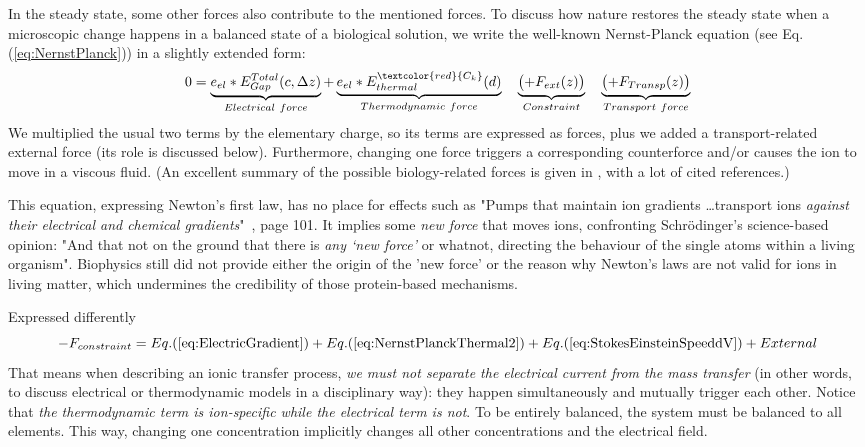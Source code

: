 In the steady state, some other forces also contribute to
the mentioned forces. To discuss how nature restores the steady state when a microscopic change happens in a
balanced state of a biological solution, we write the well-known Nernst-Planck
equation (see Eq.(\ref{eq:NernstPlanck})) in a slightly extended form:
%
\begin{equation}
	0 = \underbrace{ e_{el}*E_{Gap}^{Total}(c,\Delta z)}_{Electrical~force} +\underbrace{e_{el}*E_{thermal}^{\textcolor{red}{C_k}}(d)}_{Thermodynamic~force} \quad\underbrace{\bigl(+F_{ext}(z)\bigr)}_{Constraint}\quad\underbrace{\bigl(+F_{Transp}(z)\bigr)}_{Transport~force}\label{eq:NernstPlanckExtended}
\end{equation}
We multiplied the usual two terms by the elementary charge, so its terms are expressed as forces, plus we added a transport-related external force (its role is discussed below).
Furthermore, changing one force triggers a corresponding counterforce and/or causes the ion to move in a viscous fluid.
(An excellent summary of the possible biology-related forces is given in \cite{QuantitativeBiophysicalForces:2014}, with a lot of cited references.) 

This equation, expressing Newton's first law, has no place for effects such as "Pumps that maintain
ion gradients \dots transport ions \textit{against their
	electrical and chemical gradients}"~\cite{PrinciplesNeuralScience:2013}, page 101. It implies some \textit{new force} that moves ions,
confronting Schrödinger's science-based opinion:
"And that not on the ground that there is \textit{any ‘new force’} or whatnot, directing the behaviour of the single atoms within a living organism"\cite{Schrodinger:1992}. Biophysics still did not provide
either the origin of the 'new force' or the reason why Newton's laws are 
not valid for ions in living matter, which undermines the credibility of
those protein-based mechanisms.
\else

\fi


\ifx\magyar\undefined
Expressed differently
\begin{equation}
	-F_{constraint} = Eq.(\ref{eq:ElectricGradient}) + Eq.(\ref{eq:NernstPlanckThermal2}) + Eq.(\ref{eq:StokesEinsteinSpeeddV}) + External
	\label{eq:IonicForces}
\end{equation}
\noindent
That means when describing an ionic transfer process, \textit{we must not separate the electrical current from the mass transfer} (in other words, to discuss electrical or thermodynamic models in a disciplinary way): they happen simultaneously and mutually trigger each other. Notice that \textit{the thermodynamic term is ion-specific while the electrical term is not}. To be entirely balanced, the system must be balanced to all elements. This way, changing one concentration implicitly changes all other concentrations and the electrical field.

